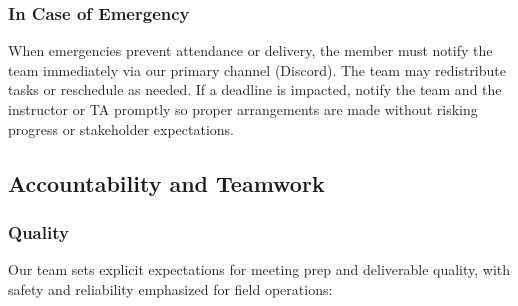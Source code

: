 \documentclass{article}
\begin{document}
\subsubsection*{\color{blue}In Case of Emergency}

When emergencies prevent attendance or delivery, the member must notify the
team immediately via our primary channel (Discord). The team may redistribute
tasks or reschedule as needed. If a deadline is impacted, notify the team and
the instructor or TA promptly so proper arrangements are made without risking
progress or stakeholder expectations.
\subsection*{Accountability and Teamwork}

\subsubsection*{\color{blue}Quality}

Our team sets explicit expectations for meeting prep and deliverable quality,
with safety and reliability emphasized for field operations:
\end{document}

